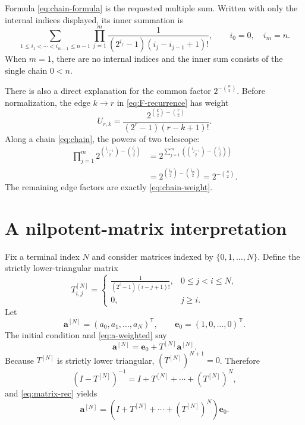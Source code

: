 \documentclass[11pt]{article}
\theoremstyle{definition}
\theoremstyle{remark}
\begin{document}
Formula \eqref{eq:chain-formula} is the requested multiple sum.  Written
with only the internal indices displayed, its inner summation is
\[
 \sum_{1\leq i_1<\cdots<i_{m-1}\leq n-1}
 \prod_{j=1}^{m}
 \frac{1}{(2^{i_j}-1)(i_j-i_{j-1}+1)!},
 \qquad i_0=0,\quad i_m=n.
\]
When $m=1$, there are no internal indices and the inner sum consists of the
single chain $0<n$.

There is also a direct explanation for the common factor
$2^{-\binom n2}$.  Before normalization, the edge $k\to r$ in
\eqref{eq:F-recurrence} has weight
\begin{equation}\label{eq:original-edge}
 U_{r,k}=
 \frac{2^{\binom k2-\binom r2}}
 {(2^r-1)(r-k+1)!}.
\end{equation}
Along a chain \eqref{eq:chain}, the powers of two telescope:
\begin{align*}
 \prod_{j=1}^{m}
 2^{\binom{i_{j-1}}2-\binom{i_j}2}
 &=2^{\sum_{j=1}^{m}
 (\binom{i_{j-1}}2-\binom{i_j}2)}\\
 &=2^{\binom{i_0}2-\binom{i_m}2}
 =2^{-\binom n2}.
\end{align*}
The remaining edge factors are exactly \eqref{eq:chain-weight}.

\section{A nilpotent-matrix interpretation}

Fix a terminal index $N$ and consider matrices indexed by
$\{0,1,\ldots,N\}$.  Define the strictly lower-triangular matrix
\begin{equation}\label{eq:matrix-T}
 T^{[N]}_{i,j}=
 \begin{cases}
 \displaystyle
 \frac{1}{(2^i-1)(i-j+1)!},&0\leq j<i\leq N,\\[6pt]
 0,&j\geq i.
 \end{cases}
\end{equation}
Let
\[
 \mathbf{a}^{[N]}=(a_0,a_1,\ldots,a_N)^{\mathsf T},
 \qquad
 \mathbf{e}_0=(1,0,\ldots,0)^{\mathsf T}.
\]
The initial condition and \eqref{eq:a-weighted} say
\begin{equation}\label{eq:matrix-rec}
 \mathbf{a}^{[N]}=\mathbf{e}_0+T^{[N]}\mathbf{a}^{[N]}.
\end{equation}
Because $T^{[N]}$ is strictly lower triangular,
$(T^{[N]})^{N+1}=0$.  Therefore
\begin{equation}\label{eq:matrix-inverse}
 (I-T^{[N]})^{-1}
 =I+T^{[N]}+\cdots+(T^{[N]})^N,
\end{equation}
and \eqref{eq:matrix-rec} yields
\begin{equation}\label{eq:matrix-solution}
 \mathbf{a}^{[N]}=
 \left(I+T^{[N]}+\cdots+(T^{[N]})^N\right)\mathbf{e}_0.
\end{equation}
\end{document}
